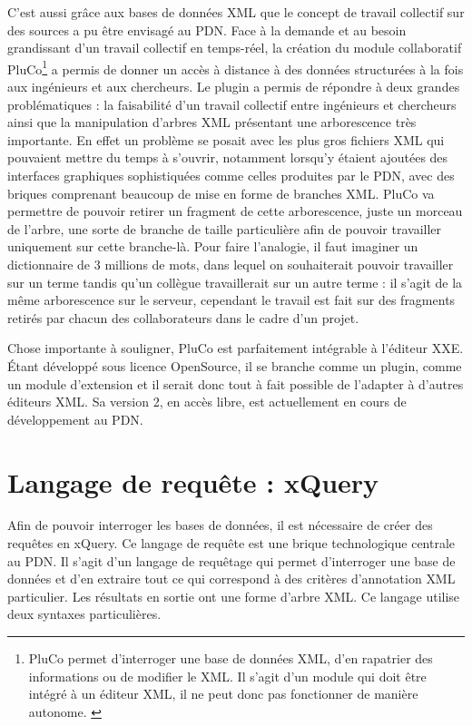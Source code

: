 \documentclass[a4paper,12pt,twoside]{book}
\begin{document}
    
    C'est aussi grâce aux bases de données \acrshort{XML} que le concept de travail collectif sur des sources a pu être envisagé au \acrshort{PDN}. Face à la demande et au besoin grandissant d'un travail collectif en temps-réel, la création du module collaboratif PluCo\footnote{PluCo permet d'interroger une base de données XML, d'en rapatrier des informations ou de modifier le XML. Il s'agit d'un module qui doit être intégré à un éditeur XML, il ne peut donc pas fonctionner de manière autonome. \cite{pluco}} a permis de donner un accès à distance à des données structurées à la fois aux ingénieurs et aux chercheurs. Le plugin a permis de répondre à deux grandes problématiques : la faisabilité d'un travail collectif entre ingénieurs et chercheurs ainsi que la manipulation d'arbres \acrshort{XML} présentant une arborescence très importante. En effet un problème se posait avec les plus gros fichiers \acrshort{XML} qui pouvaient mettre du temps à s'ouvrir, notamment lorsqu'y étaient ajoutées des interfaces graphiques sophistiquées comme celles produites par le \acrshort{PDN}, avec des briques comprenant beaucoup de mise en forme de branches \acrshort{XML}. \acrshort{PluCo} va permettre de pouvoir retirer un fragment de cette arborescence, juste un morceau de l'arbre, une sorte de branche de taille particulière afin de pouvoir travailler uniquement sur cette branche-là. Pour faire l'analogie, il faut imaginer un dictionnaire de 3 millions de mots, dans lequel on souhaiterait pouvoir travailler sur un terme tandis qu'un collègue travaillerait sur un autre terme : il s'agit de la même arborescence sur le serveur, cependant le travail est fait sur des fragments retirés par chacun des collaborateurs dans le cadre d'un projet.
    
    Chose importante à souligner, \acrshort{PluCo} est parfaitement intégrable à l'éditeur \acrshort{XXE}. Étant développé sous licence OpenSource, il se branche comme un plugin, comme un module d'extension et il serait donc tout à fait possible de l'adapter à d'autres éditeurs \acrshort{XML}. Sa version 2, en accès libre, est actuellement en cours de développement au \acrshort{PDN}.
    
    \section{Langage de requête : xQuery}\label{que}
    Afin de pouvoir interroger les bases de données, il est nécessaire de créer des requêtes en xQuery. Ce langage de requête est une brique technologique centrale au \acrshort{PDN}. Il s'agit d'un langage de requêtage qui permet d'interroger une base de données et d'en extraire tout ce qui correspond à des critères d'annotation \acrshort{XML} particulier. Les résultats en sortie ont une forme d'arbre XML.
    Ce langage utilise deux syntaxes particulières.
    
\end{document}
